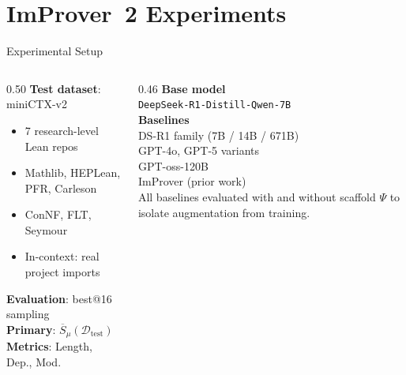 \section{ImProver~2 Experiments}

\begin{frame}{Experimental Setup}
\vspace{0.4em}
\begin{columns}[T]
\begin{column}{0.50\textwidth}
\textbf{Test dataset}: miniCTX-v2\\[0.3em]
\begin{itemize}\setlength{\itemsep}{3pt}
  \item 7 research-level Lean repos
  \item Mathlib, HEPLean, PFR, Carleson
  \item ConNF, FLT, Seymour
  \item In-context: real project imports
\end{itemize}
\vspace{0.3em}
\textbf{Evaluation}: best@16 sampling\\
\textbf{Primary}: $\overline{S}_\mu(\mathcal{D}_{\mathrm{test}})$\\
\textbf{Metrics}: Length, Dep., Mod.
\end{column}
\begin{column}{0.46\textwidth}
\textbf{Base model}\\
\texttt{DeepSeek-R1-Distill-Qwen-7B}\\[0.4em]
\textbf{Baselines}\\
DS-R1 family (7B / 14B / 671B)\\
GPT-4o, GPT-5 variants\\
GPT-oss-120B\\
ImProver (prior work)\\[0.4em]
\small All baselines evaluated with and without scaffold $\Psi$ to isolate augmentation from training.
\end{column}
\end{columns}
\end{frame}

